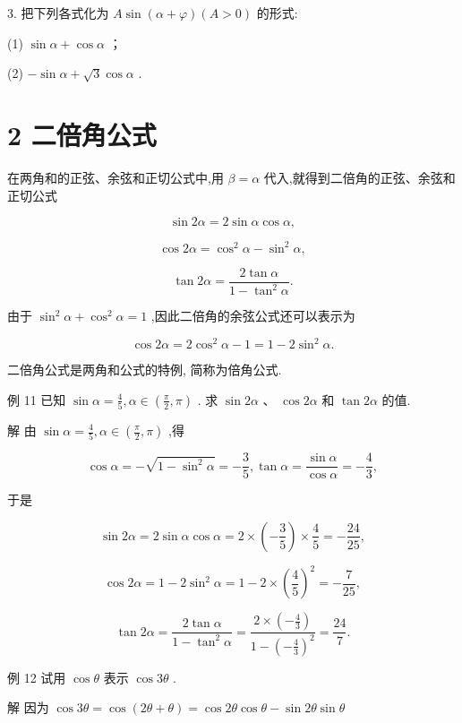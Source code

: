 \documentclass[10pt]{article}
\begin{document}
3. 把下列各式化为 \(A\sin \left( {\alpha  + \varphi }\right) \left( {A > 0}\right)\) 的形式:

(1) \(\sin \alpha  + \cos \alpha\) ；

(2) \(- \sin \alpha  + \sqrt{3}\cos \alpha\) .

\section*{2 二倍角公式}

在两角和的正弦、余弦和正切公式中,用 \(\beta  = \alpha\) 代入,就得到二倍角的正弦、余弦和正切公式

\[
\sin {2\alpha } = 2\sin \alpha \cos \alpha ,
\]

\[
\cos {2\alpha } = {\cos }^{2}\alpha  - {\sin }^{2}\alpha ,
\]

\[
\tan {2\alpha } = \frac{2\tan \alpha }{1 - {\tan }^{2}\alpha }.
\]

由于 \({\sin }^{2}\alpha  + {\cos }^{2}\alpha  = 1\) ,因此二倍角的余弦公式还可以表示为

\[
\cos {2\alpha } = 2{\cos }^{2}\alpha  - 1 = 1 - 2{\sin }^{2}\alpha .
\]

二倍角公式是两角和公式的特例, 简称为倍角公式.

例 11 已知 \(\sin \alpha  = \frac{4}{5},\alpha  \in  \left( {\frac{\pi }{2},\pi }\right)\) . 求 \(\sin {2\alpha }\text{ 、 }\cos {2\alpha }\) 和 \(\tan {2\alpha }\) 的值.

解 由 \(\sin \alpha  = \frac{4}{5},\alpha  \in  \left( {\frac{\pi }{2},\pi }\right)\) ,得

\[
\cos \alpha  =  - \sqrt{1 - {\sin }^{2}\alpha } =  - \frac{3}{5},\tan \alpha  = \frac{\sin \alpha }{\cos \alpha } =  - \frac{4}{3},
\]

于是

\[
\sin {2\alpha } = 2\sin \alpha \cos \alpha  = 2 \times  \left( {-\frac{3}{5}}\right)  \times  \frac{4}{5} =  - \frac{24}{25},
\]

\[
\cos {2\alpha } = 1 - 2{\sin }^{2}\alpha  = 1 - 2 \times  {\left( \frac{4}{5}\right) }^{2} =  - \frac{7}{25},
\]

\[
\tan {2\alpha } = \frac{2\tan \alpha }{1 - {\tan }^{2}\alpha } = \frac{2 \times  \left( {-\frac{4}{3}}\right) }{1 - {\left( -\frac{4}{3}\right) }^{2}} = \frac{24}{7}.
\]

例 12 试用 \(\cos \theta\) 表示 \(\cos {3\theta }\) .

解 因为 \(\cos {3\theta } = \cos \left( {{2\theta } + \theta }\right)  = \cos {2\theta }\cos \theta  - \sin {2\theta }\sin \theta\)
\end{document}
